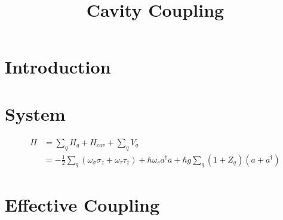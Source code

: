 \documentclass[11pt]{article}
\theoremstyle{definition}
\begin{document}
\title{Cavity Coupling}

\thispagestyle{empty}

\maketitle

\section{Introduction}
\section{System}
\begin{align}\label{EQ:cavity_hamiltonian}
    H & = \sum_q H_q + H_{cav} + \sum_q V_q \nonumber                                                                                        \\
      & = -\frac{1}{2}\sum_q (\omega_\sigma \sigma_z + \omega_\tau \tau_z) + \hbar\omega_c a^\dagger a + \hbar g \sum_q (1+Z_q)(a+a^\dagger)
\end{align}
\section{Effective Coupling}
\end{document}
